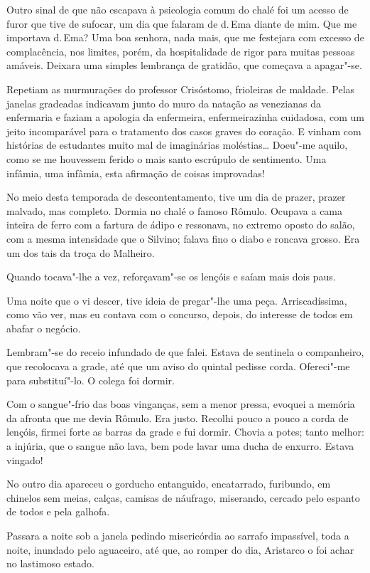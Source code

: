 Outro sinal de que
não escapava à psicologia comum do chalé foi um acesso de furor que
tive de sufocar, um dia que falaram de d.\,Ema diante de mim. Que me
importava d.\,Ema? Uma boa senhora, nada mais, que me festejara com
excesso de complacência, nos limites, porém, da hospitalidade de rigor
para muitas pessoas amáveis. Deixara uma simples lembrança de gratidão,
que começava a apagar"-se. 

Repetiam as murmurações do professor
Crisóstomo, frioleiras de maldade. Pelas janelas gradeadas indicavam
junto do muro da natação as venezianas da enfermaria e faziam a
apologia da enfermeira, enfermeirazinha cuidadosa, com um jeito
incomparável para o tratamento dos casos graves do coração. E vinham
com histórias de estudantes muito mal de imaginárias moléstias\ldots{}
Doeu"-me aquilo, como se me houvessem ferido o mais santo escrúpulo de
sentimento. Uma infâmia, uma
infâmia, esta afirmação de coisas improvadas! 

No meio desta temporada de
descontentamento, tive um dia de prazer, prazer malvado, mas completo.
Dormia no chalé o famoso Rômulo. Ocupava a cama inteira de ferro com a
fartura de ádipo e ressonava, no extremo oposto do salão, com a mesma
intensidade que o Silvino; falava fino o diabo e roncava grosso. Era um
dos tais da troça do Malheiro. 

Quando tocava"-lhe a vez,
reforçavam"-se os lençóis e saíam mais dois paus. 

Uma noite que o vi
descer, tive ideia de pregar"-lhe uma peça. Arriscadíssima, como vão
ver, mas eu contava com o concurso, depois, do interesse de todos em
abafar o negócio. 

Lembram"-se do receio infundado de que falei. Estava
de sentinela o companheiro, que recolocava a grade, até que um aviso do
quintal pedisse corda. Ofereci"-me para substituí"-lo. O colega foi
dormir. 

Com o sangue"-frio das boas vinganças, sem a menor pressa,
evoquei a memória da afronta que me devia Rômulo. Era justo. Recolhi
pouco a pouco a corda de lençóis, firmei forte as barras da grade e fui
dormir. Chovia a potes; tanto melhor: a injúria, que o sangue não lava,
bem pode lavar uma ducha de enxurro. Estava vingado! 

No outro dia
apareceu o gorducho entanguido, encatarrado, furibundo, em chinelos sem
meias, calças, camisas de náufrago, miserando, cercado pelo espanto de
todos e pela galhofa. 

Passara a noite sob a janela pedindo misericórdia
ao sarrafo impassível, toda a noite, inundado pelo aguaceiro, até que,
ao romper do dia, Aristarco o foi achar no lastimoso estado. 

